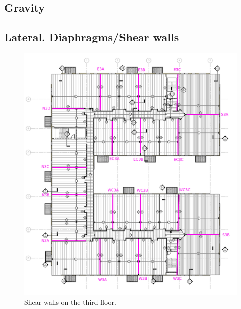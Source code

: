 \subsection{Gravity}

\subsection{Lateral. Diaphragms/Shear walls}

\begin{figure}
  \begin{center}
  \includegraphics[width=120mm]{figures/3rd_floor_key_plan}
  \end{center}
  \caption{Shear walls on the third floor.}
\end{figure}
